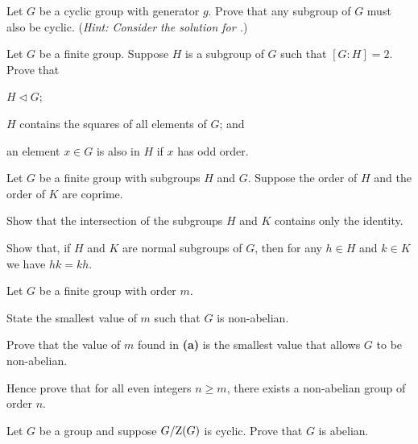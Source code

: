 \begin{problem}\label{problem-subgroup-of-cyclic-group-is-cyclic}
    Let $G$ be a cyclic group with generator $g$. Prove that any subgroup of $G$ must also be cyclic.\newline
    (\textit{Hint: Consider the solution for .})
\end{problem}

\newpage

\begin{problem}\label{problem-subgroup-of-index-2}
    Let $G$ be a finite group. Suppose $H$ is a subgroup of $G$ such that $[G:H] = 2$. Prove that
    \begin{partquestions}{\roman*}
        \item $H \lhd G$;
        \item $H$ contains the squares of all elements of $G$; and
        \item an element $x \in G$ is also in $H$ if $x$ has odd order.
    \end{partquestions}
\end{problem}

\begin{problem}\label{problem-intersection-of-coprime-subgroups}
    Let $G$ be a finite group with subgroups $H$ and $G$. Suppose the order of $H$ and the order of $K$ are coprime.
    \begin{partquestions}{\alph*}
        \item Show that the intersection of the subgroups $H$ and $K$ contains only the identity.
        \item Show that, if $H$ and $K$ are normal subgroups of $G$, then for any $h \in H$ and $k \in K$ we have $hk = kh$.
    \end{partquestions}
\end{problem}

\begin{problem}\label{problem-smallest-nonabelian-group}
    Let $G$ be a finite group with order $m$.
    \begin{partquestions}{\alph*}
        \item State the smallest value of $m$ such that $G$ is non-abelian.
        \item Prove that the value of $m$ found in \textbf{(a)} is the smallest value that allows $G$ to be non-abelian.
        \item Hence prove that for all even integers $n \geq m$, there exists a non-abelian group of order $n$.
    \end{partquestions}
\end{problem}

\begin{problem}\label{problem-quotient-of-group-mod-center-is-cyclic-implies-abelian}
    Let $G$ be a group and suppose $G / \mathrm{Z}(G)$ is cyclic. Prove that $G$ is abelian.
\end{problem}

